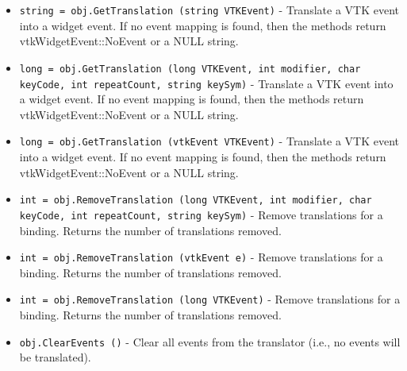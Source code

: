 \begin{itemize}
\item  \verb|string = obj.GetTranslation (string VTKEvent)| -  Translate a VTK event into a widget event. If no event mapping is found,
 then the methods return vtkWidgetEvent::NoEvent or a NULL string.

\item  \verb|long = obj.GetTranslation (long VTKEvent, int modifier, char keyCode, int repeatCount, string keySym)| -  Translate a VTK event into a widget event. If no event mapping is found,
 then the methods return vtkWidgetEvent::NoEvent or a NULL string.

\item  \verb|long = obj.GetTranslation (vtkEvent VTKEvent)| -  Translate a VTK event into a widget event. If no event mapping is found,
 then the methods return vtkWidgetEvent::NoEvent or a NULL string.

\item  \verb|int = obj.RemoveTranslation (long VTKEvent, int modifier, char keyCode, int repeatCount, string keySym)| -  Remove translations for a binding. 
 Returns the number of translations removed.

\item  \verb|int = obj.RemoveTranslation (vtkEvent e)| -  Remove translations for a binding. 
 Returns the number of translations removed.

\item  \verb|int = obj.RemoveTranslation (long VTKEvent)| -  Remove translations for a binding. 
 Returns the number of translations removed.

\item  \verb|obj.ClearEvents ()| -  Clear all events from the translator (i.e., no events will be
 translated).

\end{itemize}
